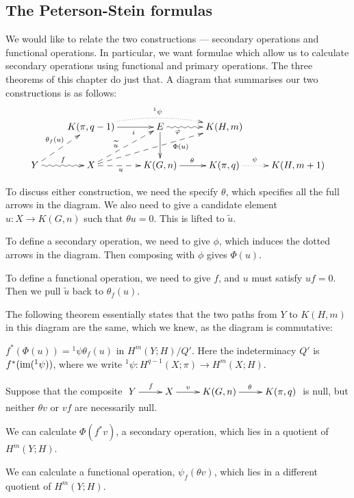 \documentclass[11pt]{article}
\begin{document}
\subsection{The Peterson-Stein formulas}
We would like to relate the two constructions --- secondary operations and
functional operations. In particular, we want formulae which allow us to
calculate secondary operations using functional and primary operations. The
three theorems of this chapter do just that. A diagram that summarises our two
constructions is as follows:
\[\xymatrix{
&K(\pi,q-1)\ar[r]_{\ \ \ \ \ i}\ar@{.>}@/^.8pc/[rr]^{^1\psi}&
E\ar@{~>}[r]_{\phi\ \ \ \ \ \ \ \ \ }\ar[d]&K(H,m)\\
Y\ar@{~>}[r]^f\ar@{-->}[ru]^{\theta_f(u)}&
X\ar@{-->}[ru]^(.4){\widetilde u}
\ar@{-->}[r]_{u\ \ \ }\ar@{-->}[rru]_(.65){\Phi(u)}&
K(G,n)\ar[r]^\theta&K(\pi,q)\ar@{.>}[r]^{\psi\ \ \ \ }&
K(H,m+1)
}\]
\begin{itemise}
\item To discuss either construction, we need the specify $\theta$, which
specifies all the full arrows in the diagram. We also need to give a candidate
element $u:X\to K(G,n)$ such that $\theta u=0$. This is lifted to $\widetilde
u$.
\item To define a secondary operation, we need to give $\phi$, which induces the
dotted arrows in the diagram. Then composing with $\phi$ gives $\Phi(u)$.
\item To define a functional operation, we need to give $f$, and $u$ must
satisfy $u f=0$. Then we pull $\widetilde u$ back to $\theta_f(u)$.
\end{itemise}
The following theorem essentially states that the two paths from $Y$ to $K(H,m)$
in this diagram are the same, which we knew, as the diagram is commutative:
\begin{thm*}
$f^*(\Phi(u))={^1\psi}\theta_f(u)$ in $H^m(Y;H)/Q'$. Here the indeterminacy $Q'$
is $f^*(\operatorname{im}({^1\psi}))$, where we write $^1\psi:H^{q-1}(X;\pi)\to H^{m}(X;H)$.
\end{thm*}
Suppose that the composite
$\xymatrix{Y\ar[r]^f&X\ar[r]^{v\ \ \ \ } &K(G,n)\ar[r]^\theta&K(\pi,q)}$
is null, but neither $\theta v$ or $vf$ are necessarily null.
\begin{itemise}
\item We can calculate $\Phi(f^*v)$, a secondary operation, which lies in a
quotient of $H^m(Y;H)$.
\item We can calculate a functional operation, $\psi_f(\theta v)$, which lies in
a different quotient of $H^m(Y;H)$.
\end{itemise}
\end{document}
